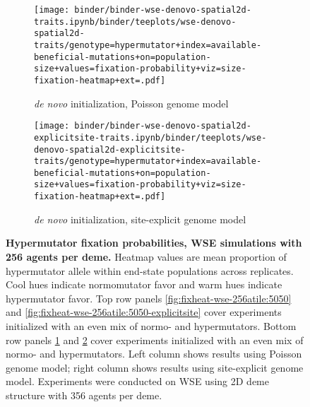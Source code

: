 \begin{figure}[h]
\begin{subfigure}[b]{0.5\linewidth}
    \begin{minipage}{\linewidth}
          \texttt{[image: binder/binder-wse-denovo-spatial2d-traits.ipynb/binder/teeplots/wse-denovo-spatial2d-traits/genotype=hypermutator+index=available-beneficial-mutations+on=population-size+values=fixation-probability+viz=size-fixation-heatmap+ext=.pdf]}%
    \end{minipage}
    \begin{minipage}{\linewidth}
    \caption{\textit{de novo} initialization, Poisson genome model}
    \label{fig:fixheat-wse-256atile:denovo}
    \end{minipage}%
\end{subfigure}%
\begin{subfigure}[b]{0.5\linewidth}
    \begin{minipage}{\linewidth}
          \texttt{[image: binder/binder-wse-denovo-spatial2d-explicitsite-traits.ipynb/binder/teeplots/wse-denovo-spatial2d-explicitsite-traits/genotype=hypermutator+index=available-beneficial-mutations+on=population-size+values=fixation-probability+viz=size-fixation-heatmap+ext=.pdf]}%
    \end{minipage}
    \begin{minipage}{\linewidth}
    \caption{\textit{de novo} initialization, site-explicit genome model}
    \label{fig:fixheat-wse-256atile:denovo-explicitsite}
    \end{minipage}%
\end{subfigure}

  \begin{minipage}{\linewidth}
    \caption{%
\textbf{Hypermutator fixation probabilities, WSE simulations with 256 agents per deme.}
\footnotesize
Heatmap values are mean proportion of hypermutator allele within end-state populations across replicates.
Cool hues indicate normomutator favor and warm hues indicate hypermutator favor.
Top row panels \ref{fig:fixheat-wse-256atile:5050} and \ref{fig:fixheat-wse-256atile:5050-explicitsite} cover experiments initialized with an even mix of normo- and hypermutators.
Bottom row panels \ref{fig:fixheat-wse-256atile:denovo} and \ref{fig:fixheat-wse-256atile:denovo-explicitsite} cover experiments initialized with an even mix of normo- and hypermutators.
Left column shows results using Poisson genome model; right column shows results using site-explicit genome model.
Experiments were conducted on WSE using 2D deme structure with 356 agents per deme.
    }
    \label{fig:fixheat-wse-256atile}
  \end{minipage}
\end{figure}
